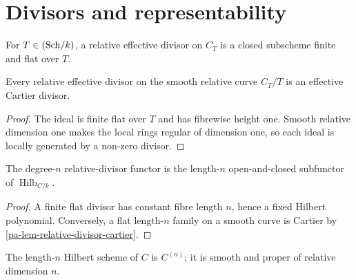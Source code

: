\chapter{Divisors and representability}
\label{pa-ch-divisors}

\begin{definition}
  \label{pa-def-relative-effective-divisor}
  \cite{kleiman-picard}
  For \(T\in(\mathrm{Sch}/k)\), a relative effective divisor on \(C_T\) is a closed
  subscheme finite and flat over \(T\).
\end{definition}

\begin{lemma}
  \label{pa-lem-relative-divisor-cartier}
  \cite{kleiman-picard}
  Every relative effective divisor on the smooth relative curve \(C_T/T\) is
  an effective Cartier divisor.
\end{lemma}

\begin{proof}
  The ideal is finite flat over \(T\) and has fibrewise height one.  Smooth
  relative dimension one makes the local rings regular of dimension one, so
  each ideal is locally generated by a non-zero divisor.
\end{proof}

\begin{lemma}
  \label{pa-lem-divisor-hilbert-functor}
  \cite{kleiman-picard,nitsure-hilbert-quot}
  The degree-\(n\) relative-divisor functor is the length-\(n\) open-and-closed
  subfunctor of \(\operatorname{Hilb}_{C/k}\).
\end{lemma}

\begin{proof}
  A finite flat divisor has constant fibre length \(n\), hence a fixed Hilbert
  polynomial.  Conversely, a flat length-\(n\) family on a smooth curve is
  Cartier by \ref{pa-lem-relative-divisor-cartier}.
\end{proof}

\begin{lemma}
  \label{pa-lem-symmetric-power-represents}
  \cite{milne-av,kleiman-picard}
  The length-\(n\) Hilbert scheme of \(C\) is \(C^{(n)}\); it is smooth and
  proper of relative dimension \(n\).
\end{lemma}

